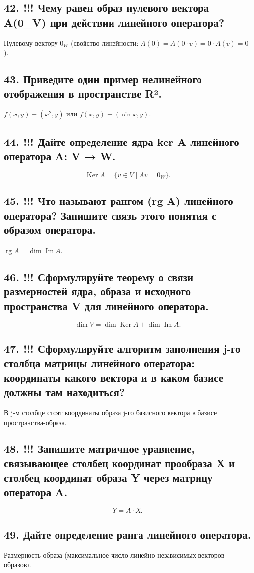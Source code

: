 \documentclass[a4paper,12pt]{article}
\newcommand{\rg}{\operatorname{rg}}
\newcommand{\im}{\operatorname{Im}}
\newcommand{\ker}{\operatorname{Ker}}
\begin{document}
\subsection*{42. !!! Чему равен образ нулевого вектора A(0_V) при действии линейного оператора?}
Нулевому вектору \(0_W\) (свойство линейности: \(A(0)=A(0\cdot v)=0\cdot A(v)=0\)).

\subsection*{43. Приведите один пример нелинейного отображения в пространстве R².}
\(f(x,y) = (x^2, y)\) или \(f(x,y) = (\sin x, y)\).

\subsection*{44. !!! Дайте определение ядра ker A линейного оператора A: V → W.}
\[ \ker A = \{ v \in V \mid A v = 0_W \}. \]

\subsection*{45. !!! Что называют рангом (rg A) линейного оператора? Запишите связь этого понятия с образом оператора.}
\(\rg A = \dim \im A\).

\subsection*{46. !!! Сформулируйте теорему о связи размерностей ядра, образа и исходного пространства V для линейного оператора.}
\[ \dim V = \dim \ker A + \dim \im A. \]

\subsection*{47. !!! Сформулируйте алгоритм заполнения j-го столбца матрицы линейного оператора: координаты какого вектора и в каком базисе должны там находиться?}
В j-м столбце стоят координаты образа j-го базисного вектора в базисе пространства-образа.

\subsection*{48. !!! Запишите матричное уравнение, связывающее столбец координат прообраза X и столбец координат образа Y через матрицу оператора A.}
\[ Y = A \cdot X. \]

\subsection*{49. Дайте определение ранга линейного оператора.}
Размерность образа (максимальное число линейно независимых векторов-образов).
\end{document}
